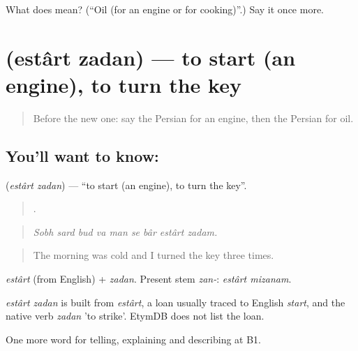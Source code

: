 \begin{tcolorbox}[breakable,colback=teal!4,colframe=teal!35!black,title={Before you move on}]
What does  mean? (\textquotedblleft{}Oil (for an engine or for cooking)\textquotedblright{}.) Say it once more.
\end{tcolorbox}
\section[\texorpdfstring{\fa{استارت} \fa{زدن} (estârt zadan)}{استارت زدن (estârt zadan)}]{  (estârt zadan) — to start (an engine), to turn the key}

\label{lesson:FA-C422-estart-zadan}



\begin{quote}
Before the new one: say the Persian for an engine, then the Persian for oil.
\end{quote}

\subsection*{You'll want to know:  }
\textbf{ } (\emph{estârt zadan}) — \textquotedblleft{}to start (an engine), to turn the key\textquotedblright{}.

\begin{quote}
        .
\end{quote}

\begin{quote}
\emph{Sobh sard bud va man se bâr estârt zadam.}
\end{quote}

\begin{quote}
The morning was cold and I turned the key three times.
\end{quote}

\emph{estârt} (from English) + \emph{zadan}. Present stem \emph{zan-}: \emph{estârt mizanam}.

\begin{cousinweb}
\emph{estârt zadan} is built from \emph{estârt}, a loan usually traced to English \emph{start}, and the native verb \emph{zadan} 'to strike'. EtymDB does not list the loan.
\end{cousinweb}

\begin{grammarlens}[title={What you've built}]
One more word for telling, explaining and describing at B1.
\end{grammarlens}

